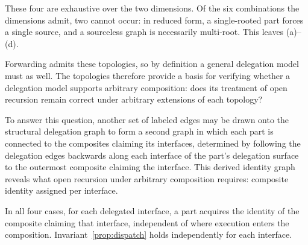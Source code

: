 \documentclass[acmsmall,nonacm]{acmart}
\theoremstyle{acmplain}
\begin{document}
These four are exhaustive over the two dimensions. Of the six combinations the dimensions admit, two cannot occur: in reduced
form, a single-rooted part forces a single source, and a sourceless graph is necessarily multi-root. This leaves (a)–(d).

Forwarding admits these topologies, so by definition a general delegation model must as well. The topologies therefore provide
a basis for verifying whether a delegation model supports arbitrary composition: does its treatment of open recursion remain
correct under arbitrary extensions of each topology?

To answer this question, another set of labeled edges may be drawn onto the structural delegation graph to form a second graph in which each part
is connected to the composites claiming its interfaces, determined by following the delegation edges backwards along each
interface of the part's delegation surface to the outermost composite claiming the interface. This derived identity graph
reveals what open recursion under arbitrary composition requires: composite identity assigned per interface.

In all four cases, for each delegated interface, a part acquires the identity of the composite claiming that interface,
independent of where execution enters the composition. Invariant~\ref{prop:dispatch} holds independently for each interface.
\end{document}
